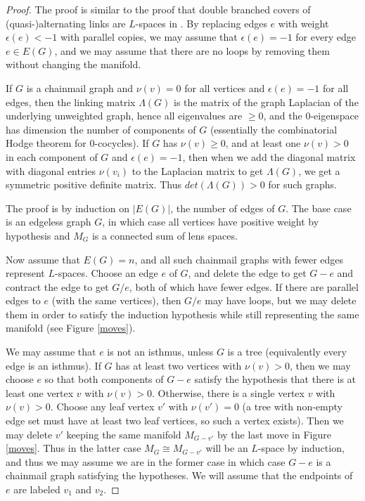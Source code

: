 \documentclass{amsart}
\theoremstyle{definition}
\theoremstyle{remark}
\begin{document}
\begin{proof}
The proof is similar to the proof that double branched covers of (quasi-)alternating links are $L$-spaces in \cite[Proposition 3.3]{MR2168576}. By replacing edges $e$ with weight $\epsilon(e)<-1$ with parallel copies, we may assume that $\epsilon(e)=-1$ for every edge $e\in E(G)$, and we may assume that there are no loops by removing them without changing the manifold. 

If $G$ is a chainmail graph and $\nu(v)=0$ for all vertices and $\epsilon(e)=-1$ for all edges, then the linking matrix $\Lambda(G)$ is the matrix of the graph Laplacian of the underlying unweighted graph, hence all eigenvalues are $\geq 0$, and the $0$-eigenspace has dimension the number of components of $G$ (essentially the combinatorial Hodge theorem for $0$-cocycles). If $G$ has $\nu(v)\geq 0$, and at least one $\nu(v)>0$ in each component of $G$ and $\epsilon(e)=-1$, then when we add the diagonal matrix with diagonal entries $\nu(v_i)$ to the Laplacian matrix to get $\Lambda(G)$, we get a symmetric positive definite matrix. Thus $det(\Lambda(G))>0$ for such graphs.

The proof is by induction on $|E(G)|$, the number of edges of $G$. The base case is an edgeless graph $G$, in which case all  
vertices have positive weight by hypothesis and $M_G$ is a connected sum of lens spaces. 

Now assume that $E(G)=n$, and all such chainmail graphs with fewer edges represent $L$-spaces. Choose an edge $e$ of $G$, and delete the edge to get $G-e$ and contract the edge to get $G/e$, both of which have fewer edges. If there are parallel edges to $e$ (with the same vertices), then $G/e$ may have loops, but we may delete them in order to satisfy the induction hypothesis while still representing the same manifold (see Figure \ref{moves}). 

We may assume that $e$ is not an isthmus, unless $G$ is a tree (equivalently every edge is an isthmus).  If $G$ has at least two vertices with $\nu(v)>0$, then we may choose $e$ so that both components of $G-e$ satisfy the hypothesis that there is at least one vertex $v$ with $\nu(v)>0$. Otherwise, there is a single vertex $v$ with $\nu(v)>0$. Choose any leaf vertex $v'$ with $\nu(v')=0$ (a tree with non-empty edge set must have at least two leaf vertices, so such a vertex exists). Then we may delete $v'$ keeping the same manifold $M_{G-v'}$ by the last move in Figure \ref{moves}. Thus in the latter case $M_G\cong M_{G-v'}$ will be an $L$-space by induction, and thus we may assume we are in the former case in which case $G-e$ is a chainmail graph satisfying the hypotheses. We will assume that the endpoints of $e$ are labeled $v_1$ and $v_2$. 




\end{proof}
\end{document}
